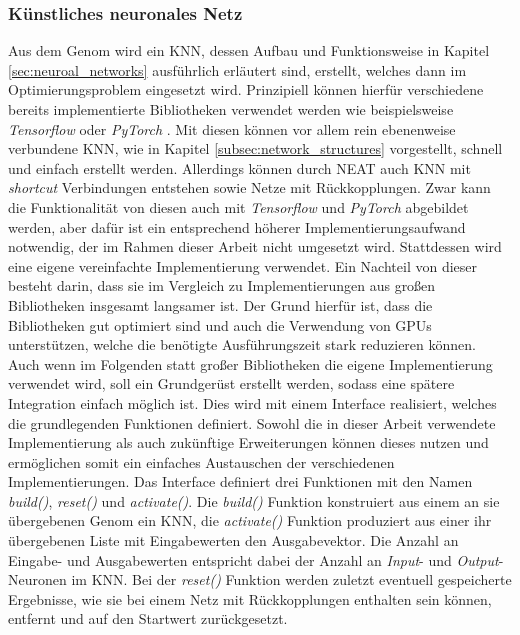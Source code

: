 \subsubsection{Künstliches neuronales Netz}
Aus dem Genom wird ein \ac{KNN}, dessen Aufbau und Funktionsweise in Kapitel \ref{sec:neuroal_networks} ausführlich erläutert sind, erstellt, welches dann im Optimierungsproblem eingesetzt wird. Prinzipiell können hierfür verschiedene bereits implementierte Bibliotheken verwendet werden wie beispielsweise \emph{Tensorflow} \cite{tensorflow2015} oder \emph{PyTorch} \cite{pytorch2019}. Mit diesen können vor allem rein ebenenweise verbundene \ac{KNN}, wie in Kapitel \ref{subsec:network_structures} vorgestellt, schnell und einfach erstellt werden. Allerdings können durch \ac{NEAT} auch \ac{KNN} mit \emph{shortcut} Verbindungen entstehen sowie Netze mit Rückkopplungen. Zwar kann die Funktionalität von diesen auch mit \emph{Tensorflow} und \emph{PyTorch} abgebildet werden, aber dafür ist ein entsprechend höherer Implementierungsaufwand notwendig, der im Rahmen dieser Arbeit nicht umgesetzt wird. Stattdessen wird eine eigene vereinfachte Implementierung verwendet. Ein Nachteil von dieser besteht darin, dass sie im Vergleich zu Implementierungen aus großen Bibliotheken insgesamt langsamer ist. Der Grund hierfür ist, dass die Bibliotheken gut optimiert sind und auch die Verwendung von \acp{GPU} unterstützen, welche die benötigte Ausführungszeit stark reduzieren können. Auch wenn im Folgenden statt großer Bibliotheken die eigene Implementierung verwendet wird, soll ein Grundgerüst erstellt werden, sodass eine spätere Integration einfach möglich ist. Dies wird mit einem Interface realisiert, welches die grundlegenden Funktionen definiert. Sowohl die in dieser Arbeit verwendete Implementierung als auch zukünftige Erweiterungen können dieses nutzen und ermöglichen somit ein einfaches Austauschen der verschiedenen Implementierungen. Das Interface definiert drei Funktionen mit den Namen \emph{build()}, \emph{reset()} und \emph{activate()}. Die \emph{build()} Funktion konstruiert aus einem an sie übergebenen Genom ein \ac{KNN}, die \emph{activate()} Funktion produziert aus einer ihr übergebenen Liste mit Eingabewerten den Ausgabevektor. Die Anzahl an Eingabe- und Ausgabewerten entspricht dabei der Anzahl an \emph{Input}- und \emph{Output}-Neuronen im \ac{KNN}. Bei der \emph{reset()} Funktion werden zuletzt eventuell gespeicherte Ergebnisse, wie sie bei einem Netz mit Rückkopplungen enthalten sein können, entfernt und auf den Startwert zurückgesetzt. 
\\\\
